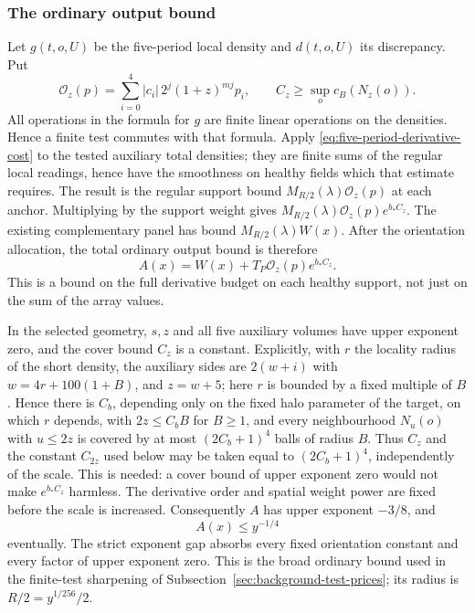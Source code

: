 \subsubsection{The ordinary output bound}
Let $g(t,o,U)$ be the five-period local density and $d(t,o,U)$
its discrepancy. Put
\[
 \mathcal O_z(p)=\sum_{i=0}^4|c_i|\,2^j(1+z)^{mj}p_i,
 \qquad C_z\ge\sup_o c_B(N_z(o)).
\]
All operations in the formula for $g$ are finite linear
operations on the densities. Hence a finite test commutes with
that formula. Apply \eqref{eq:five-period-derivative-cost} to
the tested auxiliary total densities; they are finite sums of the
regular local readings, hence have the smoothness on healthy fields
which that estimate requires. The result is the regular
support bound $M_{R/2}(\lambda)\mathcal O_z(p)$ at each anchor.
Multiplying by the support weight gives
$M_{R/2}(\lambda)\mathcal O_z(p)e^{b_*C_z}$.
The existing complementary panel has bound
$M_{R/2}(\lambda)W(x)$. After the orientation allocation,
the total ordinary output bound is therefore
\begin{equation}\label{eq:projected-ordinary-price}
       A(x)=W(x)+T_P\mathcal O_z(p)e^{b_*C_z}.
\end{equation}
This is a bound on the full derivative budget on each healthy
support, not just on the sum of the array values.

In the selected geometry, $s,z$ and all five auxiliary volumes
have upper exponent zero, and the cover bound $C_z$ is a constant.
Explicitly, with $r$ the locality radius of the short density, the
auxiliary sides are $2(w+i)$ with $w=4r+100(1+B)$, and $z=w+5$; here
$r$ is bounded by a fixed multiple of $B$. Hence there is $C_b$,
depending only on the fixed halo parameter of the target, on which
$r$ depends, with $2z\le C_bB$ for
$B\ge1$, and every neighbourhood $N_u(o)$ with $u\le2z$ is covered
by at most $(2C_b+1)^4$ balls of radius $B$. Thus $C_z$ and the
constant $C_{2z}$ used below may be taken equal to $(2C_b+1)^4$,
independently of the scale. This is needed: a cover bound of upper
exponent zero would not make $e^{b_*C_z}$ harmless. The derivative order and
spatial weight power are fixed before the scale is increased.
Consequently $A$ has upper exponent $-3/8$, and
\begin{equation}\label{eq:projected-broad-bound}
                                A(x)\le y^{-1/4}
\end{equation}
eventually. The strict exponent gap absorbs every fixed
orientation constant and every factor of upper exponent zero.
This is the broad ordinary bound used in the finite-test
sharpening of Subsection~\ref{sec:background-test-prices}; its
radius is $R/2=y^{1/256}/2$.

